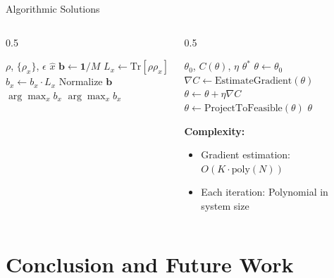 \documentclass[10pt]{beamer}
\begin{document}
\begin{frame}{Algorithmic Solutions}
\begin{columns}
\begin{column}{0.5\textwidth}
\begin{algorithm}[H]
\caption{Approximate Quantum Decoding}
\begin{algorithmic}[1]
\Require $\rho$, $\{\rho_x\}$, $\epsilon$
\Ensure $\hat{x}$
\State $\mathbf{b} \leftarrow \mathbf{1}/M$
\State $L_x \leftarrow \text{Tr}[\rho \rho_x]$
\State $b_x \leftarrow b_x \cdot L_x$
\EndFor
\State Normalize $\mathbf{b}$
\State \Return $\arg\max_x b_x$
\EndIf
\EndFor
\State \Return $\arg\max_x b_x$
\end{algorithmic}
\end{algorithm}
\end{column}

\begin{column}{0.5\textwidth}
\begin{algorithm}[H]
\caption{Fiber Parameter Optimization}
\begin{algorithmic}[1]
\Require $\theta_0$, $C(\theta)$, $\eta$
\Ensure $\theta^*$
\State $\theta \leftarrow \theta_0$
\State $\nabla C \leftarrow \text{EstimateGradient}(\theta)$
\State $\theta \leftarrow \theta + \eta \nabla C$
\State $\theta \leftarrow \text{ProjectToFeasible}(\theta)$
\EndFor
\State \Return $\theta$
\end{algorithmic}
\end{algorithm}

\textbf{Complexity:}
\begin{itemize}
\item Gradient estimation: $O(K \cdot \text{poly}(N))$
\item Each iteration: Polynomial in system size
\end{itemize}
\end{column}
\end{columns}
\end{frame}

\section{Conclusion and Future Work}
\end{document}
